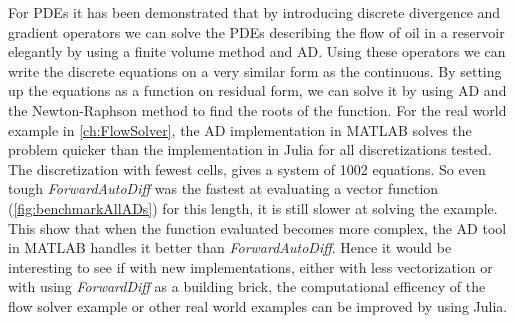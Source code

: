 For PDEs it has been demonstrated that by introducing discrete divergence and gradient operators we can solve the PDEs describing the flow of oil in a reservoir elegantly by using a finite volume method and AD. Using these operators we can write the discrete equations on a very similar form as the continuous. By setting up the equations as a function on residual form, we can solve it by using AD and the Newton-Raphson method to find the roots of the function. For the real world example in \autoref{ch:FlowSolver}, the AD implementation in MATLAB solves the problem quicker than the implementation in Julia for all discretizations tested. The discretization with fewest cells, gives a system of 1002 equations. So even tough \textit{ForwardAutoDiff} was the fastest at evaluating a vector function (\autoref{fig:benchmarkAllADs}) for this length, it is still slower at solving the example. This show that when the function evaluated becomes more complex, the AD tool in MATLAB handles it better than \textit{ForwardAutoDiff}. Hence it would be interesting to see if with new implementations, either with less vectorization or with using \textit{ForwardDiff} as a building brick, the computational efficency of the flow solver example or other real world examples can be improved by using Julia.

